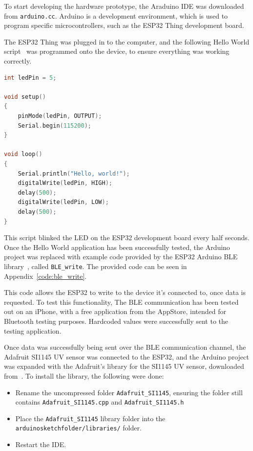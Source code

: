 \documentclass[12pt,openany,a4paper]{book}
\newcommand{\app}[1]  {Appendix~\ref{#1}}	%
\begin{document}
To start developing the hardware prototype, the Araduino IDE was downloaded from
\verb|arduino.cc|. Arduino is a development environment, which is used to program
specific microcontrollers, such as the ESP32 Thing development board.

The ESP32 Thing was plugged in to the computer, and the following Hello World
script~\cite{sparkfun_thing} was programmed onto the device, to ensure everything was working correctly.

\begin{lstlisting}[basicstyle=\ttfamily,breaklines=true,language=c++]
int ledPin = 5;

void setup()
{
    pinMode(ledPin, OUTPUT);
    Serial.begin(115200);
}

void loop()
{
    Serial.println("Hello, world!");
    digitalWrite(ledPin, HIGH);
    delay(500);
    digitalWrite(ledPin, LOW);
    delay(500);
}
\end{lstlisting}

This script blinked the LED on the ESP32 development board every half seconds.
Once the Hello World application has been successfully tested, the Arduino
project was replaced with example code provided by the ESP32 Arduino BLE library~\cite{arduino_ble_write},
called \verb|BLE_write|. The provided code can be seen in \app{code:ble_write}.

This code allows the ESP32 to write to the device it's connected to, once data
is requested. To test this functionality, The BLE communication has been tested
out on an iPhone, with a free application from the AppStore, intended for
Bluetooth testing purposes. Hardcoded values were successfully sent to the
testing application.

Once data was successfully being sent over the BLE communication channel, the
Adafruit SI1145 UV sensor was connected to the ESP32, and the Arduino project
was expanded with the Adafruit's library for the SI1145 UV sensor, downloaded
from~\cite{adafruit_code}. To install the library, the following were done:
\begin{itemize}
	\item Rename the uncompressed folder \verb|Adafruit_SI1145|, ensuring the
	folder still contains \verb|Adafruit_SI1145.cpp| and \verb|Adafruit_SI1145.h|
	\item Place the \verb|Adafruit_SI1145| library folder into the \verb|arduinosketchfolder/libraries/|
	folder. 
	\item Restart the IDE.
\end{itemize}
\end{document}
